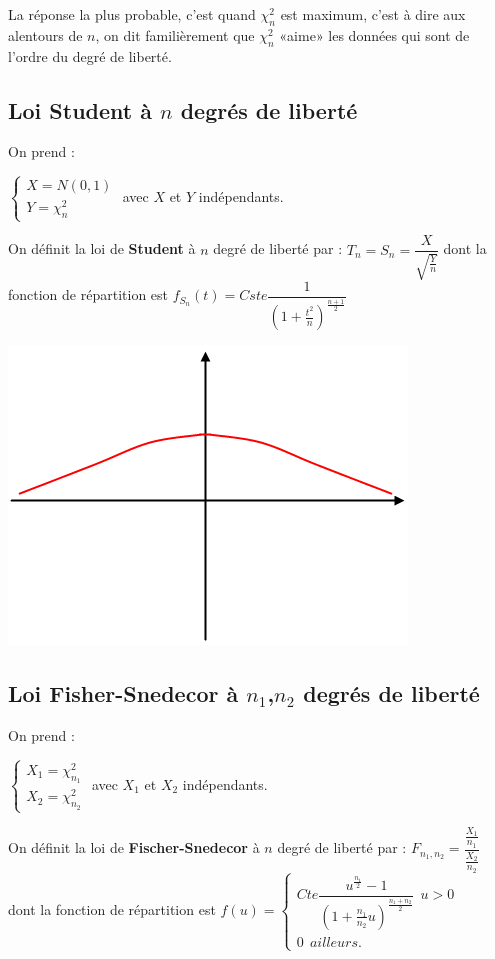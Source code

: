 \documentclass{article}
\begin{document}
La réponse la plus probable, c'est quand $\chi_n^2$ est maximum, c'est à dire aux alentours de $n$, on dit familièrement que
$\chi_n^2$ «aime» les données qui sont de l'ordre du degré de liberté.

\subsection{Loi Student à $n$ degrés de liberté}

On prend : 

$\left \{
\begin{array}{l}
X = N(0,1) \\
Y=\chi_n^2
\end{array}
\right.
$
avec $X$ et $Y$ indépendants.

On définit la loi de \textbf{Student} à $n$ degré de liberté par : $T_n = S_n = \dfrac{X}{\sqrt{\frac{Y}{n}}}$ dont la
fonction de répartition est $f_{S_n}(t) = Cste \dfrac{1}{ (1+\frac{t^2}{n}) ^ {\frac{n+1}{2}}}$

\includegraphics{Figure1-5.png}

\subsection{Loi Fisher-Snedecor à $n_1$,$n_2$ degrés de liberté}

On prend : 

$\left \{
\begin{array}{l}
X_1 = \chi_{n_1}^2 \\
X_2=\chi_{n_2}^2
\end{array}
\right.
$
avec $X_1$ et $X_2$ indépendants.

On définit la loi de \textbf{Fischer-Snedecor} à $n$ degré de liberté par : $F_{n_1,n_2} = \dfrac{\frac{X_1}{n_1}}
{\frac{X_2}{n_2}}$ dont la fonction de \indent répartition est $f(u) = 
\left \{
\begin{array}{l}
Cte \dfrac{u^{\frac{n_1}{2}} - 1} { (1 + \frac{n_1}{n_2} u) ^ {\frac{n_1+n_2}{2}}}\ \ u > 0 \\
0\ \ ailleurs.
\end{array}
\right.
$
\end{document}
